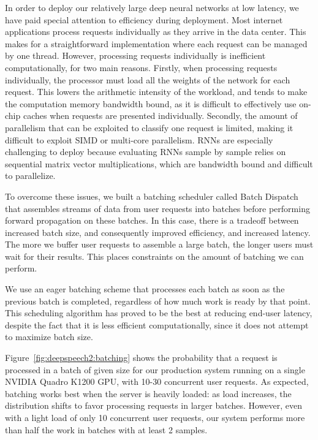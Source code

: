 In order to deploy our relatively large deep neural networks at low latency, we
have paid special attention to efficiency during deployment. Most internet
applications process requests individually as they arrive in the data center.
This makes for a straightforward implementation where each request can be
managed by one thread. However, processing requests individually is inefficient
computationally, for two main reasons. Firstly, when processing requests
individually, the processor must load all the weights of the network for each
request. This lowers the arithmetic intensity of the workload, and tends to
make the computation memory bandwidth bound, as it is difficult to effectively
use on-chip caches when requests are presented individually. Secondly, the
amount of parallelism that can be exploited to classify one request is limited,
making it difficult to exploit SIMD or multi-core parallelism. RNNs are
especially challenging to deploy because evaluating RNNs sample by sample
relies on sequential matrix vector multiplications, which are bandwidth bound
and difficult to parallelize.

To overcome these issues, we built a batching scheduler called Batch Dispatch
that assembles streams of data from user requests into batches before
performing forward propagation on these batches. In this case, there is a
tradeoff between increased batch size, and consequently improved efficiency,
and increased latency. The more we buffer user requests to assemble a large
batch, the longer users must wait for their results. This places constraints on
the amount of batching we can perform.

We use an eager batching scheme that processes each batch as soon as the
previous batch is completed, regardless of how much work is ready by that
point. This scheduling algorithm has proved to be the best at reducing end-user
latency, despite the fact that it is less efficient computationally, since it
does not attempt to maximize batch size.

Figure~\ref{fig:deepspeech2:batching} shows the probability that a request is
processed in a batch of given size for our production system running on a
single NVIDIA Quadro K1200 GPU, with 10-30 concurrent user requests. As
expected, batching works best when the server is heavily loaded: as load
increases, the distribution shifts to favor processing requests in larger
batches. However, even with a light load of only 10 concurrent user requests,
our system performs more than half the work in batches with at least 2 samples.

